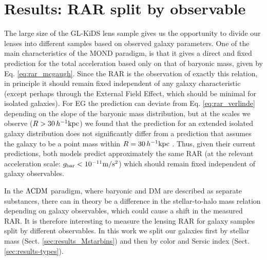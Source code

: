 \documentclass[usenatbib]{mnras}
\newcommand{\hkpc}{\, h^{-1}{\rm{kpc}} }
\newcommand{\mpss}{ {\rm m/s^2} }
\newcommand{\lcdm}{{\rm \Lambda CDM}}
\newcommand{\un}[1]{_{\rm #1}}
\begin{document}

\section{Results: RAR split by observable}
\label{sec:results-observables}

The large size of the GL-KiDS lens sample gives us the opportunity to divide our lenses into different samples based on observed galaxy parameters. One of the main characteristics of the MOND paradigm, is that it gives a direct and fixed prediction for the total acceleration based only on that of baryonic mass, given by Eq. \ref{eq:rar_mcgaugh}. Since the RAR is the observation of exactly this relation, in principle it should remain fixed independent of any galaxy characteristic (except perhaps through the External Field Effect, which should be minimal for isolated galaxies). For EG the prediction can deviate from Eq. \ref{eq:rar_verlinde} depending on the slope of the baryonic mass distribution, but at the scales we observe ($R>30\hkpc$) we found that the prediction for an extended isolated galaxy distribution does not significantly differ from a prediction that assumes the galaxy to be a point mass within $R=30\hkpc$ \cite[see Sect. 4.3 of][]{brouwer2017}. Thus, given their current predictions, both models predict approximately the same RAR (at the relevant acceleration scale: $g\un{bar}<10^{-11} \mpss$) which should remain fixed independent of galaxy observables.

In the $\lcdm$ paradigm, where baryonic and DM are described as separate substances, there can in theory be a difference in the stellar-to-halo mass relation depending on galaxy observables, which could cause a shift in the measured RAR. It is therefore interesting to measure the lensing RAR for galaxy samples split by different observables. In this work we split our galaxies first by stellar mass (Sect. \ref{sec:results_Mstarbins}) and then by color and Sersic index (Sect. \ref{sec:results-types}).
\end{document}
